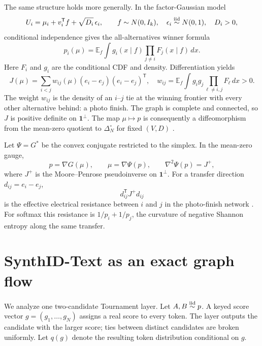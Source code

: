 \documentclass[11pt]{article}
\theoremstyle{definition}
\theoremstyle{remark}
\newcommand{\E}{\mathbb{E}}
\newcommand{\one}{\mathbf{1}}
\newcommand{\trans}{\mathsf{T}}
\begin{document}
The same structure holds more generally. In the factor-Gaussian model
\begin{equation}
U_i=\mu_i+v_i^\trans f+\sqrt{D_i}\,\epsilon_i,
\qquad
f\sim N(0,I_k),\quad \epsilon_i\stackrel{\rm iid}{\sim}N(0,1),\quad D_i>0,
\label{eq:factor-probit}
\end{equation}
conditional independence gives the all-alternatives winner formula
\begin{equation}
p_i(\mu)=\E_f\int g_i(x\mid f)\prod_{j\ne i}F_j(x\mid f)\,dx.
\label{eq:shared-field}
\end{equation}
Here $F_i$ and $g_i$ are the conditional CDF and density. Differentiation yields
\begin{equation}
J(\mu)=\sum_{i<j}w_{ij}(\mu)(e_i-e_j)(e_i-e_j)^\trans,
\quad
w_{ij}=\E_f\int g_i g_j\prod_{\ell\ne i,j}F_\ell\,dx>0.
\label{eq:general-photo-finish}
\end{equation}
The weight $w_{ij}$ is the density of an $i$--$j$ tie at the winning frontier with every other alternative behind: a photo finish. The graph is complete and connected, so $J$ is positive definite on $\one^\perp$. The map $\mu\mapsto p$ is consequently a diffeomorphism from the mean-zero quotient to $\Delta_N^\circ$ for fixed $(V,D)$ \citep{cotton2026calibration}.

Let $\Psi=G^*$ be the convex conjugate restricted to the simplex. In the mean-zero gauge,
\begin{equation}
p=\nabla G(\mu),\qquad \mu=\nabla\Psi(p),\qquad \nabla^2\Psi(p)=J^+,
\label{eq:mirror-map}
\end{equation}
where $J^+$ is the Moore--Penrose pseudoinverse on $\one^\perp$. For a transfer direction $d_{ij}=e_i-e_j$,
\begin{equation}
d_{ij}^\trans J^+d_{ij}
\label{eq:resistance}
\end{equation}
is the effective electrical resistance between $i$ and $j$ in the photo-finish network \citep{cotton2026gaussian}. For softmax this resistance is $1/p_i+1/p_j$, the curvature of negative Shannon entropy along the same transfer.

\section{SynthID-Text as an exact graph flow}
\label{sec:synthid}

We analyze one two-candidate Tournament layer. Let $A,B\stackrel{\rm iid}{\sim}p$. A keyed score vector $g=(g_1,\ldots,g_N)$ assigns a real score to every token. The layer outputs the candidate with the larger score; ties between distinct candidates are broken uniformly. Let $q(g)$ denote the resulting token distribution conditional on $g$.
\end{document}
